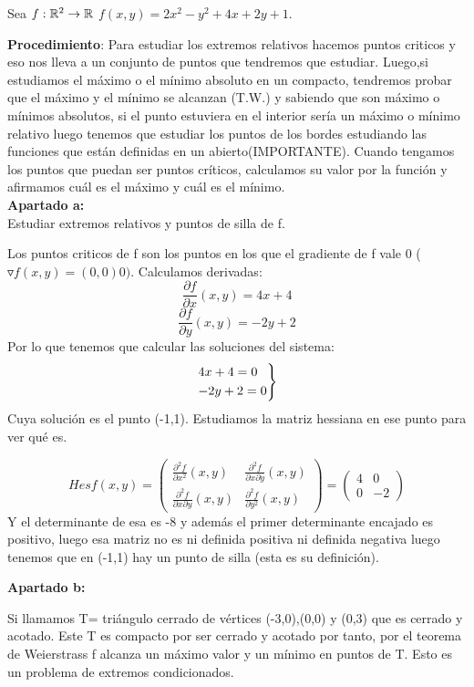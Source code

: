 \begin{ejer}
	Sea $f:\mathbb{R}^2 \to \mathbb{R}$
	$f(x,y) = 2x^2 -y^2 +4x+2y+1$.

	\textbf{Procedimiento}: Para estudiar los extremos relativos hacemos puntos criticos y eso nos lleva a un conjunto de puntos que tendremos que estudiar. Luego,si estudiamos el máximo o el mínimo absoluto en un compacto, tendremos probar que el máximo y el mínimo se alcanzan (T.W.) y sabiendo que son máximo o mínimos absolutos, si el punto estuviera en el interior sería un máximo o mínimo relativo luego tenemos que estudiar los puntos de los bordes estudiando las funciones que están definidas en un abierto(IMPORTANTE). Cuando tengamos los puntos que puedan ser puntos críticos, calculamos su valor por la función y afirmamos cuál es el máximo y cuál es el mínimo.\\

\textbf{Apartado a:}\\
	 Estudiar extremos relativos y puntos de silla de f.

	Los puntos criticos de f son los puntos en los que el gradiente de f vale 0 ( $\triangledown f (x,y) = (0,0)0)$. Calculamos derivadas:
	\[
	\frac{\partial f}{\partial x}(x,y) = 4 x+ 4
	\]\[
	\frac{\partial f}{\partial y}(x,y) = -2y +2
	\]
	Por lo que tenemos que calcular las soluciones del sistema:
	\[
	\begin{rcases}
	4x+4 = 0\\
	-2y+2 = 0
\end{rcases}
	\]
	Cuya solución es el punto (-1,1).
	Estudiamos la matriz hessiana en ese punto para ver qué es.

	\[
	Hesf(x,y) = \begin{pmatrix}
 \frac{\partial^2f}{\partial x^2}(x,y) &  \frac{\partial^2f}{\partial x \partial y}(x,y) \\
  \frac{\partial^2f}{\partial x \partial y}(x,y) &  \frac{\partial^2f}{\partial y^2}(x,y)
\end{pmatrix}  =  \begin{pmatrix}
  4& 0 \\
 0 & -2
\end{pmatrix}
	\]
	Y el determinante de esa es -8 y además el primer determinante encajado es positivo, luego esa matriz no es ni definida positiva ni definida negativa luego tenemos que en (-1,1) hay un punto de silla (esta es su definición).

	\textbf{Apartado b:}

	Si llamamos T= triángulo cerrado de vértices (-3,0),(0,0) y (0,3) que es cerrado y acotado. Este T es compacto por ser cerrado y acotado por tanto, por el teorema de Weierstrass f alcanza un máximo valor y un mínimo en puntos de T.
	Esto es un problema de extremos condicionados.


\end{ejer}
